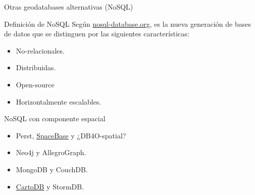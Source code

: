 \documentclass{classes/beamer_GeomaticaUA}
\begin{document}
\begin{frame}{Otras geodatabases alternativas (NoSQL)}
\begin{block}{Definición de NoSQL}
Según \href{http://nosql-database.org/}{nosql-database.org}, es la nueva generación de bases de datos que se distinguen por las siguientes características:
\begin{itemize}
\item No-relacionales.
\item Distribuidas.
\item Open-source
\item Horizontalmente escalables.
\end{itemize}
\end{block}

\begin{block}{NoSQL con componente espacial}
\begin{itemize}
\item Perst, \href{http://paralleluniverse.co/product/}{SpaceBase} y ¿DB4O-spatial? 
\item Neo4j y AllegroGraph.
\item MongoDB y CouchDB.
\item \href{http://cartodb.com/}{CartoDB} y StormDB.
\end{itemize}
\end{block}
\end{frame}
\end{document}
